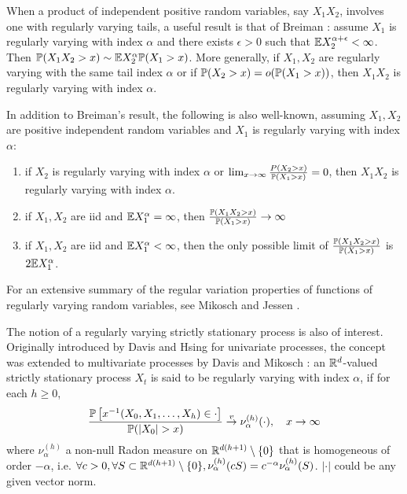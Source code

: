 When a product of independent positive random variables, say $X_1
X_2$, involves one with regularly varying tails, a useful result is
that of Breiman \cite{breiman:1965}: assume $X_1$ is regularly varying
with index $\alpha$ and there exists $\epsilon > 0$ such that
$\E X_2^{\alpha + \epsilon} < \infty$.
Then $\P(X_1 X_2 > x) \sim \E X_2^{\alpha} \P(X_1 > x)$.
More generally, if $X_1, X_2$ are regularly varying with the same tail
index $\alpha$ or if $\P(X_2 > x) = o(\P(X_1 > x))$, then $X_1 X_2$ is
regularly varying with index $\alpha$.

In addition to Breiman's result, the following is also well-known,
assuming $X_1, X_2$ are positive independent random variables and
$X_1$ is regularly varying with index $\alpha$:
\begin{enumerate}
\item if $X_2$ is regularly varying with index $\alpha$ or
  $\lim_{x \to \infty} {P(X_2 > x) \over \P(X_1 > x)} = 0$, then $X_1
  X_2$ is regularly varying with index $\alpha$.
\item if $X_1, X_2$ are iid and $\E X_1^\alpha = \infty$, then
  ${\P(X_1 X_2 > x) \over \P(X_1 > x)} \to \infty$
\item if $X_1, X_2$ are iid and $\E X_1^\alpha < \infty$, then the
  only possible limit of ${\P(X_1 X_2 > x) \over \P(X_1 > x)}$ is
  $2 \E X_1^\alpha$.
\end{enumerate}
For an extensive summary of the regular variation properties of
functions of regularly varying random variables, see Mikosch and
Jessen \cite{JessenMikosch2006}.

The notion of a regularly varying strictly stationary process is also of
interest. Originally introduced by Davis and Hsing
\cite{davis:hsing:1995} for univariate processes, the concept was
extended to multivariate processes by Davis and Mikosch
\cite{davis:mikosch:2009b}: an $\reals^d$-valued strictly stationary
process $X_t$ is said to be regularly varying with index $\alpha$, if
for each $h \geq 0$, 
\[
  {
    \P\left[x^{-1}(X_0, X_1, \dots, X_h) \in \cdot \right]
    \over
    \P(|X_0| > x)
  } \overset{v}{\to} \nu^{(h)}_\alpha(\cdot),
  \quad x \to \infty
\]
where $\nu_\alpha^{(h)}$ a non-null Radon measure on
$\reals^{d(h+1)} \setminus \{0\}$ that
is homogeneous of order $-\alpha$, i.e.
$\forall c > 0, \forall S \subset \reals^{d(h+1)}\setminus\{0\}, \nu_\alpha^{(h)}(c S) = c^{-\alpha} \nu_\alpha^{(h)}(S)$. $|\cdot|$ could be any given vector norm.

